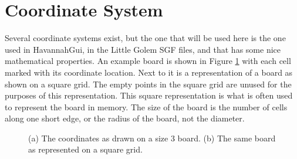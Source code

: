 \section{Coordinate System}

Several coordinate systems exist, but the one that will be used here is the one used in HavannahGui, in the Little Golem SGF files, and that has some nice mathematical properties. An example board is shown in Figure \ref{fig:coordinates} with each cell marked with its coordinate location. Next to it is a representation of a board as shown on a square grid. The empty points in the square grid are unused for the purposes of this representation. This square representation is what is often used to represent the board in memory. The size of the board is the number of cells along one short edge, or the radius of the board, not the diameter.

\begin{figure}
\centering

\caption{(a) The coordinates as drawn on a size 3 board. (b) The same board as represented on a square grid.}
\label{fig:coordinates}
\end{figure}

